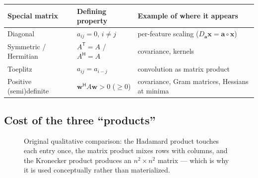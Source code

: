\documentclass[11pt,a4paper]{article}
\newcommand{\T}{^{\mathsf{T}}}
\newcommand{\Her}{^{\mathsf{H}}}
\newcommand{\Had}{\circ}
\theoremstyle{definition}
\theoremstyle{plain}
\begin{document}
\begin{center}
\footnotesize
\begin{tabular}{@{}lll@{}}
\toprule
Special matrix & Defining property & Example of where it appears\\\midrule
Diagonal & $a_{ij}=0$, $i\ne j$ & per-feature scaling ($D_{\mathbf a}\mathbf x=\mathbf a\Had\mathbf x$)\\
Symmetric / Hermitian & $A\T=A$ / $A\Her=A$ & covariance, kernels\\
Toeplitz & $a_{ij}=a_{i-j}$ & convolution as matrix product\\
Positive (semi)definite & $\mathbf w\Her A\mathbf w>0$ ($\ge0$) & covariance, Gram matrices, Hessians at minima\\\bottomrule
\end{tabular}
\end{center}

\subsection{Cost of the three ``products''}

\begin{figure}[ht]
\centering
{}
\caption{Original qualitative comparison: the Hadamard product touches each entry once, the matrix product mixes rows with columns, and the Kronecker product produces an $n^2\times n^2$ matrix --- which is why it is used conceptually rather than materialized.}
\end{figure}
\end{document}
